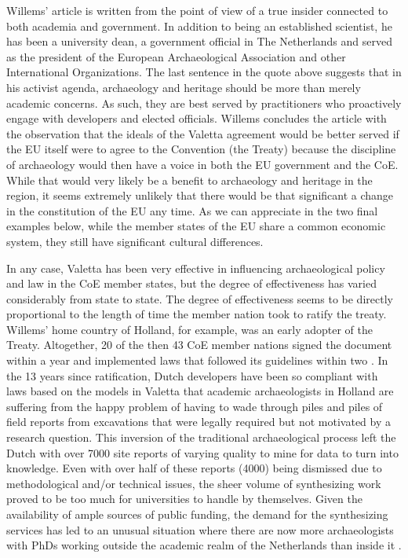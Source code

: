 Willems’ article is written from the point of view of a true insider connected to both academia and government. In addition to being an established scientist, he has been a university dean, a government official in The Netherlands and served as the president of the European Archaeological Association and other International Organizations. The last sentence in the quote above suggests that in his activist agenda, archaeology and heritage should be more than merely academic concerns. As such, they are best served by practitioners who proactively engage with developers and elected officials. Willems concludes the article with the observation that the ideals of the Valetta agreement would be better served if the EU itself were to agree to the Convention (the Treaty) because the discipline of archaeology would then have a voice in both the EU government and the CoE. While that would very likely be a benefit to archaeology and heritage in the region, it seems extremely unlikely that there would be that significant a change in the constitution of the EU any time. As we can appreciate in the two final examples below, while the member states of the EU share a common economic system, they still have significant cultural differences.  


In any case, Valetta has been very effective in influencing archaeological policy and law in the CoE member states, but the degree of effectiveness has varied considerably from state to state. The degree of effectiveness seems to be directly proportional to the length of time the member nation took to ratify the treaty. Willems’ home country of Holland, for example, was an early adopter of the Treaty. Altogether, 20 of the then 43 CoE member nations signed the document within a year and implemented laws that followed its guidelines within two \parencite[58]{Willems_2007}. 
In the 13 years since ratification, Dutch developers have been so compliant with laws based on the models in Valetta that academic archaeologists in Holland are suffering from the happy problem of having to wade through piles and piles of field reports from excavations that were legally required but not motivated by a research question. This inversion of the traditional archaeological process left the Dutch with over \num{7000} site reports of varying quality to mine for data to turn into knowledge. Even with over half of these reports (\num{4000}) being dismissed due to methodological and/or technical issues, the sheer volume of synthesizing work proved to be too much for universities to handle by themselves. 
Given the availability of ample sources of public funding, the demand for the synthesizing services has led to an unusual situation where there are now more archaeologists with PhDs working outside the academic realm of the Netherlands than inside it \parencite[93]{Groenewoudt_2014}.  

